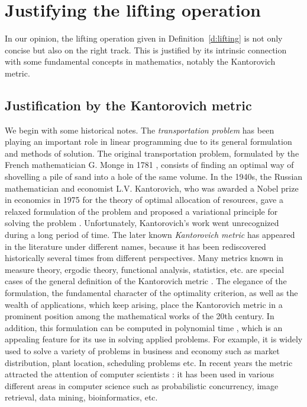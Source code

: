 \documentclass{article}
\begin{document}
\section{Justifying the lifting operation}\label{s:justify}
In our opinion, the lifting operation given in
Definition~\ref{d:lifting} is not only concise but also on the right
track. This is justified by its intrinsic connection with some
fundamental concepts in mathematics, notably the Kantorovich metric.
\subsection{Justification by the Kantorovich metric}\label{s:kan}

We begin with some historical notes. The \emph{transportation
problem} has been playing an important role in linear programming
due to its general formulation and methods of
solution. The original transportation problem, formulated by the French mathematician G. Monge in 1781 \cite{Mon1781}, consists of finding an optimal way of shovelling a pile of sand into
a hole of the same volume. In the 1940s, the Russian mathematician and economist L.V.
Kantorovich, who was awarded a Nobel prize in economics in 1975 for
the theory of optimal allocation of resources, gave a relaxed
formulation of the problem and proposed a variational principle for
solving the problem \cite{Kan42}. Unfortunately, Kantorovich's work
went unrecognized during a long period of time. The later known
\emph{Kantorovich metric} has appeared in the literature under
different names, because it has been rediscovered historically
several times from different perspectives. Many metrics known in
measure theory, ergodic theory, functional analysis, statistics,
etc. are special cases of the general definition of the Kantorovich
metric \cite{Ver06}. The elegance of the formulation, the
fundamental character of the optimality criterion, as well as the
wealth of applications, which keep arising, place the Kantorovich
metric in a prominent position among the mathematical works of the
20th century. In addition, this formulation can be computed in
polynomial time \cite{Orl88}, which is an appealing feature for its
use in solving applied problems. For example, it is widely used to
solve a variety of problems in business and economy such as market
distribution, plant location, scheduling problems etc. In recent
years the metric attracted the attention of computer scientists
\cite{DD09}: it has been used in various different areas in computer
science such as probabilistic concurrency, image retrieval, data
mining, bioinformatics, etc.
\end{document}
